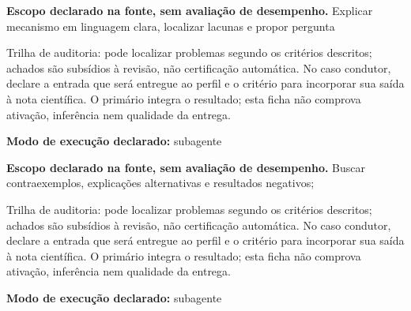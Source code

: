 
\begin{descricao}
\textbf{Escopo declarado na fonte, sem avaliação de desempenho.}
Explicar mecanismo em linguagem clara, localizar lacunas e propor pergunta
\end{descricao}

\begin{funcao}
Trilha de auditoria: pode localizar problemas segundo os critérios descritos; achados são subsídios à revisão, não certificação automática. No caso condutor, declare a entrada que será entregue ao perfil e o critério para incorporar sua saída à nota científica. O primário integra o resultado; esta ficha não comprova ativação, inferência nem qualidade da entrega.
\end{funcao}

\begin{arquitetura}
\textbf{Modo de execução declarado:} subagente
\end{arquitetura}


\begin{descricao}
\textbf{Escopo declarado na fonte, sem avaliação de desempenho.}
Buscar contraexemplos, explicações alternativas e resultados negativos;
\end{descricao}

\begin{funcao}
Trilha de auditoria: pode localizar problemas segundo os critérios descritos; achados são subsídios à revisão, não certificação automática. No caso condutor, declare a entrada que será entregue ao perfil e o critério para incorporar sua saída à nota científica. O primário integra o resultado; esta ficha não comprova ativação, inferência nem qualidade da entrega.
\end{funcao}

\begin{arquitetura}
\textbf{Modo de execução declarado:} subagente
\end{arquitetura}

